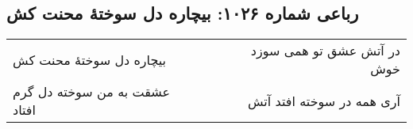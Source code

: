 \begin{center}
\section*{رباعی شماره ۱۰۲۶: بیچاره دل سوختهٔ محنت کش}
\label{sec:1026}
\begin{longtable}{l p{0.5cm} r}
بیچاره دل سوختهٔ محنت کش
&&
در آتش عشق تو همی سوزد خوش
\\
عشقت به من سوخته دل گرم افتاد
&&
آری همه در سوخته افتد آتش
\\
\end{longtable}
\end{center}

